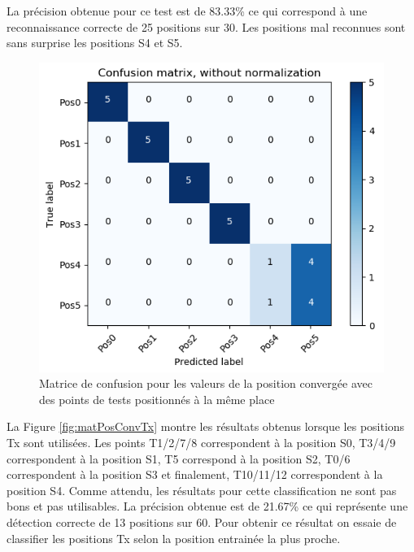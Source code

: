 La précision obtenue pour ce test est de 83.33\% ce qui correspond à une reconnaissance correcte de 25 positions sur 30. Les positions mal reconnues sont sans surprise les positions S4 et S5.

\begin{figure}[htp]
 \begin{center}
  \includegraphics[scale=0.5]{figures/mat_pos_conv_SxT.png}
  \caption{Matrice de confusion pour les valeurs de la position convergée avec des points de tests positionnés à la même place}
  \label{fig:matPosConvSxT} %
 \end{center}
\end{figure}

La Figure \ref{fig:matPosConvTx} montre les résultats obtenus lorsque les positions Tx sont utilisées. Les points T1/2/7/8 correspondent à la position S0, T3/4/9 correspondent à la position S1, T5 correspond à la position S2, T0/6 correspondent à la position S3 et finalement, T10/11/12 correspondent à la position S4. Comme attendu, les résultats pour cette classification ne sont pas bons et pas utilisables. La précision obtenue est de 21.67\% ce qui représente une détection correcte de 13 positions sur 60. Pour obtenir ce résultat on essaie de classifier les positions Tx selon la position entrainée la plus proche. 

